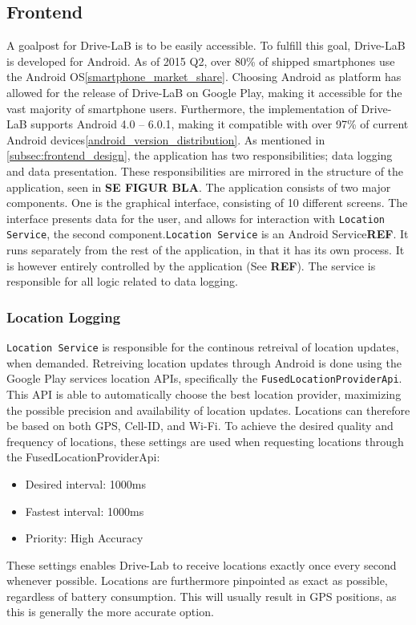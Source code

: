 \subsection{Frontend}\label{subsec:frontend_implementation}
A goalpost for Drive-LaB is to be easily accessible. To fulfill this goal, Drive-LaB is developed for Android. As of 2015 Q2, over 80\% of shipped smartphones use the Android OS\ref{smartphone_market_share}. Choosing Android as platform has allowed for the release of Drive-LaB on Google Play, making it accessible for the vast majority of smartphone users. Furthermore, the implementation of Drive-LaB supports Android 4.0 – 6.0.1, making it compatible with over 97\% of current Android devices\ref{android_version_distribution}.
As mentioned in \ref{subsec:frontend_design}, the application has two responsibilities; data logging and data presentation. These responsibilities are mirrored in the structure of the application, seen in \textbf{SE FIGUR BLA}. The application consists of two major components. One is the graphical interface, consisting of 10 different screens. The interface presents data for the user, and allows for interaction with \texttt{Location Service}, the second component.\texttt{Location Service} is an Android Service\textbf{REF}. It runs separately from the rest of the application, in that it has its own process. It is however entirely controlled by the application (See \textbf{REF}). The service is responsible for all logic related to data logging.

\subsubsection{Location Logging}\label{subsubsec:location_logging}
\texttt{Location Service} is responsible for the continous retreival of location updates, when demanded. Retreiving location updates through Android is done using the Google Play services location APIs, specifically the \texttt{FusedLocationProviderApi}. This API is able to automatically choose the best location provider, maximizing the possible precision and availability of location updates. Locations can therefore be based on both GPS, Cell-ID, and Wi-Fi. To achieve the desired quality and frequency of locations, these settings are used when requesting locations through the FusedLocationProviderApi:

\begin{itemize}
\item Desired interval: 1000ms
\item Fastest interval: 1000ms
\item Priority: High Accuracy
\end{itemize}

These settings enables Drive-Lab to receive locations exactly once every second whenever possible. Locations are furthermore pinpointed as exact as possible, regardless of battery consumption. This will usually result in GPS positions, as this is generally the more accurate option.